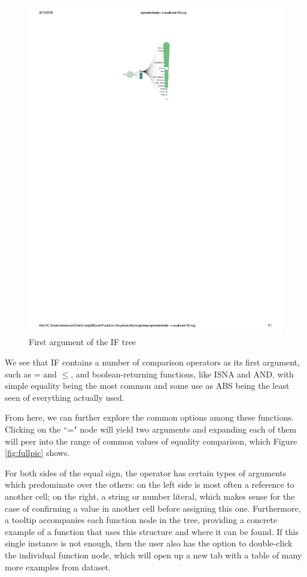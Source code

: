 \documentclass[conference]{IEEEtran}
\begin{document}
	\begin{figure}[h] \centering \includegraphics[scale=.4]{IFexpand}
		 \caption{First argument of the IF tree} \label{fig:expandif} \end{figure}
	
	We see that IF contains a number of comparison operators as its first argument,
	such as = and $\le$, and boolean-returning functions, like ISNA and AND, with
	simple equality being the most common and some use as ABS being the least seen
	of everything actually used. \par
	
	From here, we can further explore the common options among these functions.
	Clicking on the ``=" node will yield two arguments and expanding each of them
	will peer into the range of common values of equality comparison, which Figure
	\ref{fig:fullpic} shows. \par
	
	For both sides of the equal sign, the operator has certain types of arguments
	which predominate over the others: on the left side is most often a reference
	to another cell; on the right, a string or number literal, which makes sense
	for the case of confirming a value in another cell before assigning this one.
	Furthermore, a tooltip accompanies each function node in the tree, providing a
	concrete example of a function that uses this structure and where it can be
	found. If this single instance is not enough, then the user also has the option
	to double-click the individual function node, which will open up a new tab with
	a table of many more examples from dataset.
	
\end{document}

